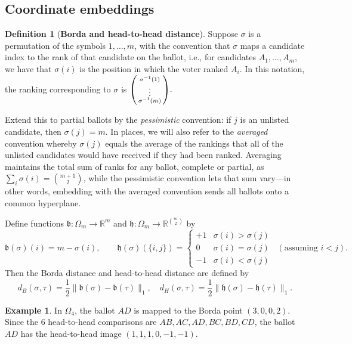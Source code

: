 \documentclass{amsart}
\newcommand{\R}{\mathbb{R}}
\newcommand{\bb}{\mathfrak{b}}
\newcommand{\hh}{\mathfrak{h}}
\theoremstyle{plain}
\theoremstyle{definition}
\newtheorem{definition}[theorem]{Definition}
\newtheorem{example}[theorem]{Example}
\theoremstyle{remark}
\begin{document}
\subsection{Coordinate embeddings}\label{subsec:coord}


\begin{definition}[\textbf{Borda and head-to-head distance}]
Suppose $\sigma$ is a permutation of the symbols $1,\dots,m$, 
with the convention that $\sigma$ maps a candidate index to the rank of that candidate on the ballot, 
i.e., for candidates $A_1,\dots,A_m$, we have that $\sigma(i)$ is the position in which the voter ranked $A_i$.
In this notation, the ranking corresponding to $\sigma$ is 
$\begin{psmallmatrix}
    \sigma^{-1}(1)\\ \vdots\\ \sigma^{-1}(m)\end{psmallmatrix}.$ 

Extend this to partial ballots 
by the \emph{pessimistic}
convention: if $j$ is an unlisted candidate, then $\sigma(j)=m$. 
In places, we will also refer to the \emph{averaged} convention whereby $\sigma(j)$ equals the average of the rankings that all of the unlisted candidates would have received if they had been ranked.  Averaging maintains the total sum of ranks for any ballot, complete or partial, as $\sum_i \sigma(i)=\binom{m+1}{2}$, while the pessimistic convention lets that sum vary---in other words, embedding with the averaged convention sends all ballots onto a common hyperplane.


Define functions $\bb:\Omega_m\to \R^m$ and 
$\hh: \Omega_m\to\R^{\binom m2}$ by
$$\bb(\sigma)(i)=m-\sigma(i), \qquad 
\hh(\sigma)(\{i,j\})= \begin{cases}
    +1 & \sigma(i)>\sigma(j)\\
    0 & \sigma(i)=\sigma(j) \\
    -1 & \sigma(i)<\sigma(j)
\end{cases} \,\,\,(\text{assuming }i<j).$$
Then the Borda distance and head-to-head distance are defined by
$$d_B(\sigma,\tau)=\frac 12 \|\bb(\sigma)-\bb(\tau)\|_1, \quad
d_H(\sigma,\tau)=\frac 12 \|\hh(\sigma)-\hh(\tau)\|_1.$$
\end{definition}


\begin{example}
In $\Omega_4$, the ballot $AD$ is  mapped to the Borda point 
$(3,0, 0, 2)$.  Since the $6$ head-to-head comparisons are $AB,AC,AD,BC,BD,CD$, the ballot $AD$ has the head-to-head image $(1,1,1,0,-1,-1)$.  
\end{example}
\end{document}
